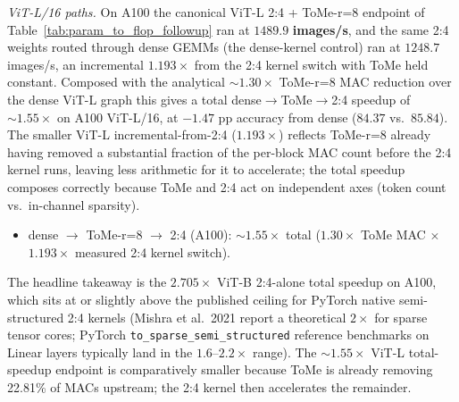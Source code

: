 \documentclass[11pt]{article}
\theoremstyle{plain}
\theoremstyle{definition}
\theoremstyle{remark}
\newcommand{\1}{\mathbf{1}}
\begin{document}
\medskip
\noindent\emph{ViT-L/16 paths.}  On A100 the canonical ViT-L 2:4 + ToMe-r=8 endpoint of Table~\ref{tab:param_to_flop_followup} ran at \(\mathbf{1489.9}\) \textbf{images/s}, and the same 2:4 weights routed through dense GEMMs (the dense-kernel control) ran at \(1248.7\) images/s, an incremental \(1.193\!\times\) from the 2:4 kernel switch with ToMe held constant.  Composed with the analytical \(\sim\!1.30\!\times\) ToMe-r=8 MAC reduction over the dense ViT-L graph this gives a total dense\(\to\)ToMe\(\to\)2:4 speedup of \(\mathbf{\sim 1.55\!\times}\) on A100 ViT-L/16, at \(-1.47\) pp accuracy from dense (\(84.37\) vs.\ \(85.84\)).  The smaller ViT-L incremental-from-2:4 (\(1.193\!\times\)) reflects ToMe-r=8 already having removed a substantial fraction of the per-block MAC count before the 2:4 kernel runs, leaving less arithmetic for it to accelerate; the total speedup composes correctly because ToMe and 2:4 act on independent axes (token count vs.\ in-channel sparsity).
\begin{itemize}
\setlength\itemsep{0pt}
\item dense \(\to\) ToMe-r=8 \(\to\) 2:4 (A100): \(\boldsymbol{\sim 1.55\!\times}\) total (\(1.30\!\times\) ToMe MAC \(\times\) \(1.193\!\times\) measured 2:4 kernel switch).
\end{itemize}

\medskip
The headline takeaway is the \(2.705\!\times\) ViT-B 2:4-alone total speedup on A100, which sits at or slightly above the published ceiling for PyTorch native semi-structured 2:4 kernels (Mishra et al.\ 2021 report a theoretical \(2\!\times\) for sparse tensor cores; PyTorch \texttt{to\_sparse\_semi\_structured} reference benchmarks on Linear layers typically land in the \(1.6\)--\(2.2\!\times\) range).  The \(\sim 1.55\!\times\) ViT-L total-speedup endpoint is comparatively smaller because ToMe is already removing 22.81\% of MACs upstream; the 2:4 kernel then accelerates the remainder.
\end{document}
